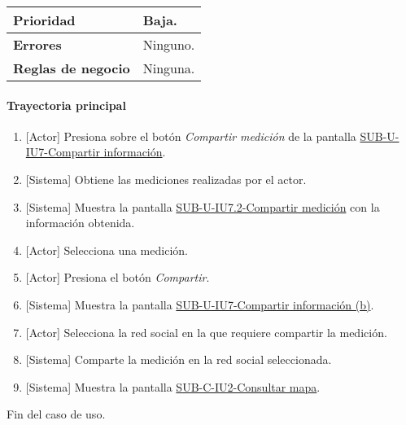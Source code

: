 \begin{longtable}{|J{5cm}|J{10.3cm}|}
		\\ \hline 
	\textbf{Prioridad} & 
		Baja. \\ \hline
	\textbf{Errores} & Ninguno.
		\\ \hline
	\textbf{Reglas de negocio} & Ninguna.
		 \\ \hline
\end{longtable}

\paragraph{Trayectoria principal}
	\begin{enumerate}
		\item {[Actor]} Presiona sobre el botón \textit{Compartir medición} de la pantalla \hyperref[fig:sub-u-iu7.a]{SUB-U-IU7-Compartir información}.
		\item {[Sistema]} Obtiene las mediciones realizadas por el actor.
		\item {[Sistema]} Muestra la pantalla \hyperref[fig:sub-u-iu7.2]{SUB-U-IU7.2-Compartir medición} con la información obtenida.
		\item {[Actor]} Selecciona una medición.
		\item {[Actor]} Presiona el botón \textit{Compartir}.
		\item \label{SUB-U-CU7.2:Pantalla} {[Sistema]} Muestra la pantalla \hyperref[fig:sub-u-iu7.b]{SUB-U-IU7-Compartir información (b)}.
		\item {[Actor]} Selecciona la red social en la que requiere compartir la medición.
		\item {[Sistema]} Comparte la medición en la red social seleccionada.
		\item  {[Sistema]} Muestra la pantalla \hyperref[fig:sub-c-iu2]{SUB-C-IU2-Consultar mapa}.
	\end{enumerate}
	Fin del caso de uso.


